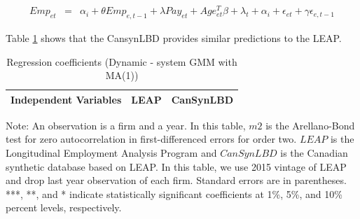 \begin{eqnarray}	
Emp_{et}&=&\alpha_i +\theta Emp_{e,t-1}+\lambda Pay_{et}+Age_{et}^{T}\beta+\lambda_t+\alpha_i+\epsilon_{et}+\gamma\epsilon_{e,t-1}
\end{eqnarray}

Table \ref{Dynamic - system GMM with MA(1)} shows that the CansynLBD provides similar predictions to the LEAP.

\begin{table}[H]
  \centering
\begin{threeparttable}
 \caption{Regression coefficients (Dynamic - system GMM with MA(1))} \label{Dynamic - system GMM with MA(1)} \medskip
\renewcommand{\arraystretch}{1}
\begin{tabular}{l|c c| c c}
\toprule
\textbf{Independent Variables}&\multicolumn{2}{c|}{\textbf{LEAP}} &  \multicolumn{2}{c}{\textbf{CanSynLBD}}\\
\midrule

   \bottomrule
  \end{tabular} 
\begin{tablenotes}
\small
\item Note: An observation is a firm and a year. In this table, $m2$ is the Arellano-Bond test for zero autocorrelation in first-differenced errors for order two. $LEAP$ is the Longitudinal Employment Analysis Program and $CanSynLBD$ is the Canadian synthetic database based on LEAP. In this table, we use 2015 vintage of LEAP and drop last year observation of each firm. Standard errors are in parentheses. ***, **, and * indicate statistically significant coefficients at 1\%, 5\%, and 10\% percent levels, respectively.
 \end{tablenotes}
 \end{threeparttable}
\end{table}